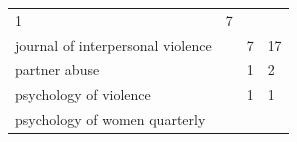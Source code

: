 \documentclass[]{tufte-handout}
\begin{document}
\begin{longtable}[]{@{}llll@{}}
\begin{minipage}[t]{0.06\columnwidth}
1\strut
\end{minipage} & \begin{minipage}[t]{0.06\columnwidth}\raggedright\strut
7\strut
\end{minipage}\tabularnewline
\begin{minipage}[t]{0.63\columnwidth}\raggedright\strut
journal of interpersonal violence\strut
\end{minipage} & \begin{minipage}[t]{0.04\columnwidth}\raggedright\strut
\strut
\end{minipage} & \begin{minipage}[t]{0.06\columnwidth}\raggedright\strut
7\strut
\end{minipage} & \begin{minipage}[t]{0.06\columnwidth}\raggedright\strut
17\strut
\end{minipage}\tabularnewline
\begin{minipage}[t]{0.63\columnwidth}\raggedright\strut
partner abuse\strut
\end{minipage} & \begin{minipage}[t]{0.04\columnwidth}\raggedright\strut
\strut
\end{minipage} & \begin{minipage}[t]{0.06\columnwidth}\raggedright\strut
1\strut
\end{minipage} & \begin{minipage}[t]{0.06\columnwidth}\raggedright\strut
2\strut
\end{minipage}\tabularnewline
\begin{minipage}[t]{0.63\columnwidth}\raggedright\strut
psychology of violence\strut
\end{minipage} & \begin{minipage}[t]{0.04\columnwidth}\raggedright\strut
\strut
\end{minipage} & \begin{minipage}[t]{0.06\columnwidth}\raggedright\strut
1\strut
\end{minipage} & \begin{minipage}[t]{0.06\columnwidth}\raggedright\strut
1\strut
\end{minipage}\tabularnewline
\begin{minipage}[t]{0.63\columnwidth}\raggedright\strut
psychology of women quarterly\strut
\end{minipage} & \begin{minipage}[t]{0.04\columnwidth}\raggedright\strut
\strut
\end{minipage} & \begin{minipage}[t]{0.06\columnwidth}\raggedright\strut

\end{minipage}
\end{longtable}
\end{document}
